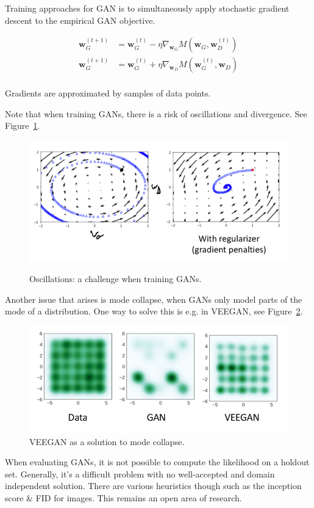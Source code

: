 \documentclass[a4paper,10pt,twoside]{article}
\begin{document}
Training approaches for GAN is to simultaneously apply stochastic gradient descent to the empirical GAN objective.

\begin{align*}
  \mathbf{w}_G^{(t+1)} &= \mathbf{w}_G^{(t)} - \eta\nabla_{\mathbf{w}_G}M(\mathbf{w}_G,\mathbf{w}_D^{(t)})\\
  \mathbf{w}_G^{(t+1)} &= \mathbf{w}_G^{(t)} + \eta\nabla_{\mathbf{w}_D}M(\mathbf{w}_G^{(t)},\mathbf{w}_D)\\
\end{align*}

Gradients are approximated by samples of data points.

Note that when training GANs, there is a risk of oscillations and divergence. See Figure~\ref{fig:oscillations_gan_training}.

\begin{figure}
  \centering
  \includegraphics[width=.6\textwidth]{figures/oscillations_gan_training.png}
  \label{fig:oscillations_gan_training}
  \caption{Oscillations: a challenge when training GANs.}
\end{figure}

Another issue that arises is mode collapse, when GANs only model parts of the mode of a distribution. One way to solve this is e.g. in VEEGAN, see Figure~\ref{fig:mode_collapse}.

\begin{figure}
  \centering
  \includegraphics[width=.5\textwidth]{figures/gan_mode_collapse.png}
  \caption{VEEGAN as a solution to mode collapse.}
  \label{fig:mode_collapse}
\end{figure}

When evaluating GANs, it is not possible to compute the likelihood on a holdout set. Generally, it's a difficult problem with no well-accepted and domain independent solution. There are various heuristics though such as the inception score \& FID for images. This remains an open area of research.
\end{document}
